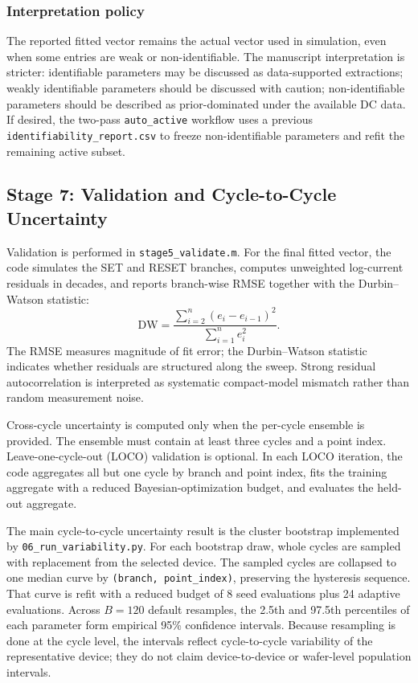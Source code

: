 \documentclass[journal]{IEEEtran}
\begin{document}
\subsubsection{Interpretation policy}
The reported fitted vector remains the actual vector used in simulation, even
when some entries are weak or non-identifiable.  The manuscript interpretation
is stricter: identifiable parameters may be discussed as data-supported
extractions; weakly identifiable parameters should be discussed with caution;
non-identifiable parameters should be described as prior-dominated under the
available DC data.  If desired, the two-pass \texttt{auto\_active} workflow
uses a previous \texttt{identifiability\_report.csv} to freeze
non-identifiable parameters and refit the remaining active subset.

\subsection{Stage 7: Validation and Cycle-to-Cycle Uncertainty}
\label{sec:uncertainty}

Validation is performed in \texttt{stage5\_validate.m}.  For the final fitted
vector, the code simulates the SET and RESET branches, computes unweighted
log-current residuals in decades, and reports branch-wise RMSE together with
the Durbin--Watson statistic:
\begin{equation}
  \mathrm{DW} =
  \frac{\sum_{i=2}^{n}(e_i-e_{i-1})^2}{\sum_{i=1}^{n}e_i^2}.
  \label{eq:dw}
\end{equation}
The RMSE measures magnitude of fit error; the Durbin--Watson statistic
indicates whether residuals are structured along the sweep.  Strong residual
autocorrelation is interpreted as systematic compact-model mismatch rather
than random measurement noise.

Cross-cycle uncertainty is computed only when the per-cycle ensemble is
provided.  The ensemble must contain at least three cycles and a point index.
Leave-one-cycle-out (LOCO) validation is optional.  In each LOCO iteration,
the code aggregates all but one cycle by branch and point index, fits the
training aggregate with a reduced Bayesian-optimization budget, and evaluates
the held-out aggregate.

The main cycle-to-cycle uncertainty result is the cluster bootstrap implemented
by \texttt{06\_run\_variability.py}.  For each bootstrap draw, whole cycles
are sampled with replacement from the selected device.  The sampled cycles are
collapsed to one median curve by \texttt{(branch, point\_index)}, preserving
the hysteresis sequence.  That curve is refit with a reduced budget of
8 seed evaluations plus 24 adaptive evaluations.  Across $B=120$ default
resamples, the 2.5th and 97.5th percentiles of each parameter form empirical
95\% confidence intervals.  Because resampling is done at the cycle level,
the intervals reflect cycle-to-cycle variability of the representative device;
they do not claim device-to-device or wafer-level population intervals.
\end{document}
